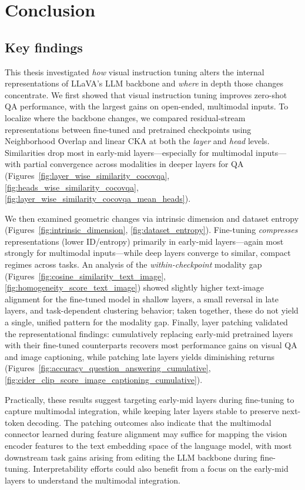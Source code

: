 \chapter{Conclusion}\label{ch:conclusions}

\section{Key findings}

This thesis investigated \emph{how} visual instruction tuning alters the internal representations of LLaVA's LLM backbone and \emph{where} in depth those changes concentrate. We first showed that visual instruction tuning improves zero-shot QA performance, with the largest gains on open-ended, multimodal inputs. To localize where the backbone changes, we compared residual-stream representations between fine-tuned and pretrained checkpoints using Neighborhood Overlap and linear CKA at both the \emph{layer} and \emph{head} levels. Similarities drop most in early-mid layers---especially for multimodal inputs---with partial convergence across modalities in deeper layers for QA (Figures~\ref{fig:layer_wise_similarity_cocovqa}, \ref{fig:heads_wise_similarity_cocovqa}, \ref{fig:layer_wise_similarity_cocovqa_mean_heads}). 

We then examined geometric changes via intrinsic dimension and dataset entropy (Figures~\ref{fig:intrinsic_dimension}, \ref{fig:dataset_entropy}). Fine-tuning \emph{compresses} representations (lower ID/entropy) primarily in early-mid layers---again most strongly for multimodal inputs---while deep layers converge to similar, compact regimes across tasks. An analysis of the \emph{within-checkpoint} modality gap (Figures~\ref{fig:cosine_similarity_text_image}, \ref{fig:homogeneity_score_text_image}) showed slightly higher text-image alignment for the fine-tuned model in shallow layers, a small reversal in late layers, and task-dependent clustering behavior; taken together, these do not yield a single, unified pattern for the modality gap. Finally, layer patching validated the representational findings: cumulatively replacing early-mid pretrained layers with their fine-tuned counterparts recovers most performance gains on visual QA and image captioning, while patching late layers yields diminishing returns (Figures~\ref{fig:accuracy_question_answering_cumulative}, \ref{fig:cider_clip_score_image_captioning_cumulative}). 


Practically, these results suggest targeting early-mid layers during fine-tuning to capture multimodal integration, while keeping later layers stable to preserve next-token decoding. The patching outcomes also indicate that the multimodal connector learned during feature alignment may suffice for mapping the vision encoder features to the text embedding space of the language model, with most downstream task gains arising from editing the LLM backbone during fine-tuning. Interpretability efforts could also benefit from a focus on the early-mid layers to understand the multimodal integration.

